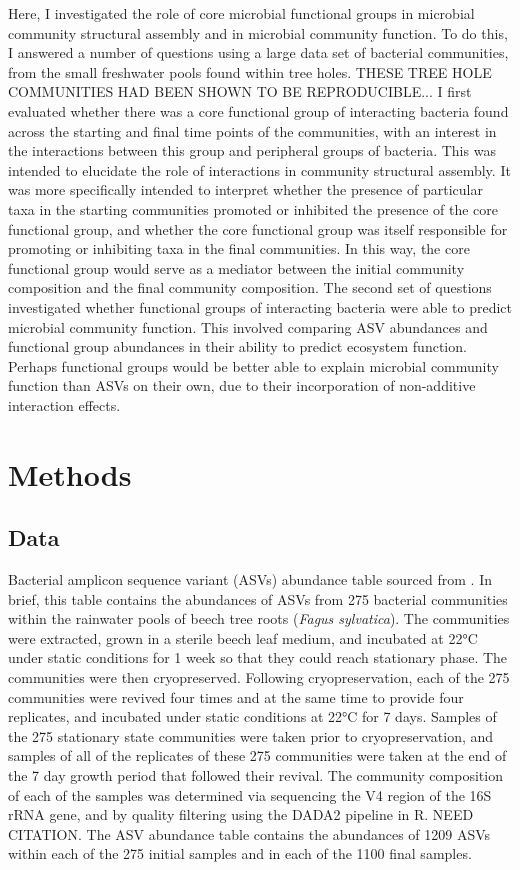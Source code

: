 \documentclass[11pt]{article}
\begin{document}
Here, I investigated the role of core microbial functional groups in microbial community structural assembly and in microbial community function. To do this, I answered a number of questions using a large data set of bacterial communities, from the small freshwater pools found within tree holes.
THESE TREE HOLE COMMUNITIES HAD BEEN SHOWN TO BE REPRODUCIBLE...
I first evaluated whether there was a core functional group of interacting bacteria found across the starting and final time points of the communities, with an interest in the interactions between this group and peripheral groups of bacteria. This was intended to elucidate the role of interactions in community structural assembly. It was more specifically intended to interpret whether the presence of particular taxa in the starting communities promoted or inhibited the presence of the core functional group, and whether the core functional group was itself responsible for promoting or inhibiting taxa in the final communities. In this way, the core functional group would serve as a mediator between the initial community composition and the final community composition. The second set of questions investigated whether functional groups of interacting bacteria were able to predict microbial community function. This involved comparing ASV abundances and functional group abundances in their ability to predict ecosystem function. Perhaps functional groups would be better able to explain microbial community function than ASVs on their own, due to their incorporation of non-additive interaction effects. 

\section{Methods}
\subsection{Data}
Bacterial amplicon sequence variant (ASVs) abundance table sourced from \cite{Pascual-Garc}. In brief, this table contains the abundances of ASVs from 275 bacterial communities within the rainwater pools of beech tree roots (\textit{Fagus sylvatica}). The communities were extracted, grown in a sterile beech leaf medium, and incubated at 22°C under static conditions for 1 week so that they could reach stationary phase. The communities were then cryopreserved. Following cryopreservation, each of the 275 communities were revived four times and at the same time to provide four replicates, and incubated under static conditions at 22°C for 7 days. Samples of the 275 stationary state communities were taken prior to cryopreservation, and samples of all of the replicates of these 275 communities were taken at the end of the 7 day growth period that followed their revival. The community composition of each of the samples was determined via sequencing the V4 region of the 16S rRNA gene, and by quality filtering using the DADA2 pipeline in R. NEED CITATION.
The ASV abundance table contains the abundances of 1209 ASVs within each of the 275 initial samples and in each of the 1100 final samples.
\end{document}
